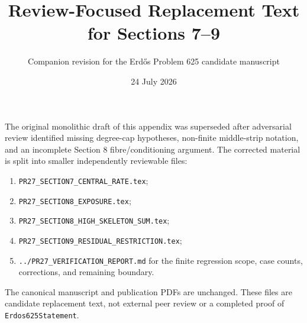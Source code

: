 \documentclass[11pt]{article}
\title{Review-Focused Replacement Text for Sections 7--9}
\author{Companion revision for the Erd\H{o}s Problem 625 candidate manuscript}
\date{24 July 2026}
\begin{document}
\maketitle

The original monolithic draft of this appendix was superseded after adversarial
review identified missing degree-cap hypotheses, non-finite middle-strip
notation, and an incomplete Section 8 fibre/conditioning argument.  The
corrected material is split into smaller independently reviewable files:

\begin{enumerate}
\item \texttt{PR27\_SECTION7\_CENTRAL\_RATE.tex};
\item \texttt{PR27\_SECTION8\_EXPOSURE.tex};
\item \texttt{PR27\_SECTION8\_HIGH\_SKELETON\_SUM.tex};
\item \texttt{PR27\_SECTION9\_RESIDUAL\_RESTRICTION.tex};
\item \texttt{../PR27\_VERIFICATION\_REPORT.md} for the finite regression
      scope, case counts, corrections, and remaining boundary.
\end{enumerate}

The canonical manuscript and publication PDFs are unchanged.  These files are
candidate replacement text, not external peer review or a completed proof of
\texttt{Erdos625Statement}.
\end{document}
